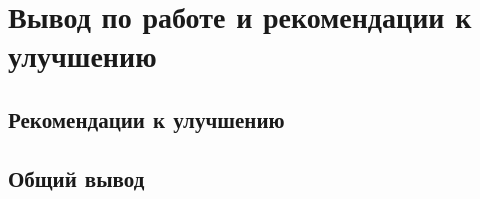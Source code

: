 \documentclass[document.tex]{subfiles}
\begin{document}
\section{Вывод по работе и рекомендации к улучшению}
\subsection{Рекомендации к улучшению}

\subsection{Общий вывод}
\end{document}
